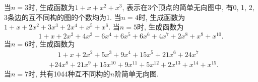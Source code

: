 \documentclass[chinese]{assignment}[2019/10/15]
\theoremstyle{plain}
\begin{document}
    当$n=3$时, 生成函数为$1+x+x^2+x^3$, 表示在3个顶点的简单无向图中, 有0, 1, 2, 3条边的互不同构的图的个数均为1. 当$n=4$时, 生成函数为$1+x+2x^2+3x^3+2x^4+x^5+x^6$. 当$n=5$时, 生成函数为
    \begin{equation}
        1+x+2x^2+4x^3+6x^4+6x^5+6x^6+4x^7+2x^8+x^9+x^{10}.
    \end{equation}
    当$n=6$时, 生成函数为
    \begin{equation}
        \begin{aligned}
            &\phantom{{}+{}}1+x+2x^2+5x^3+9x^4+15x^5+21x^6+24x^7\\
            &+24x^8+21x^9+15x^{10}+9x^{11}+5x^{12}+2x^{13}+x^{14}+x^{15}.
        \end{aligned}
    \end{equation}
    当$n=7$时, 共有1044种互不同构的$n$阶简单无向图.

    
\end{document}
